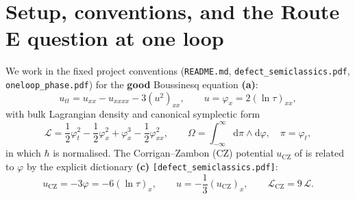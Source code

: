 \documentclass[11pt,a4paper]{article}
\newcommand{\dd}{\mathrm{d}}
\newcommand{\hb}{\hbar}
\begin{document}
\section{Setup, conventions, and the Route E question at one loop}
\label{sec:setup}

We work in the fixed project conventions (\texttt{README.md},
\texttt{defect\_semiclassics.pdf}, \texttt{oneloop\_phase.pdf}) for the
\textbf{good} Boussinesq equation \textbf{(a)}:
\begin{equation}\label{eq:good_bq}
  u_{tt} = u_{xx} - u_{xxxx} - 3(u^2)_{xx}, \qquad
  u = \varphi_x = 2(\ln\tau)_{xx},
\end{equation}
with bulk Lagrangian density and canonical symplectic form
\begin{equation}\label{eq:lagrangian}
  \mathcal{L} = \frac{1}{2}\varphi_t^2 - \frac{1}{2}\varphi_x^2
  + \varphi_x^3 - \frac{1}{2}\varphi_{xx}^2, \qquad
  \Omega = \int_{-\infty}^\infty \dd\pi\wedge\dd\varphi, \quad \pi = \varphi_t,
\end{equation}
in which $\hb$ is normalised. The Corrigan--Zambon (CZ) potential $u_{\mathrm{CZ}}$
of \cite{CZ2023} is related to $\varphi$ by the explicit dictionary \textbf{(c)}
\texttt{[defect\_semiclassics.pdf]}:
\begin{equation}\label{eq:cz_dict}
  u_{\mathrm{CZ}} = -3\varphi = -6(\ln\tau)_x, \qquad
  u = -\frac{1}{3}(u_{\mathrm{CZ}})_x, \qquad
  \mathcal{L}_{\mathrm{CZ}} = 9\,\mathcal{L}.
\end{equation}
\end{document}
